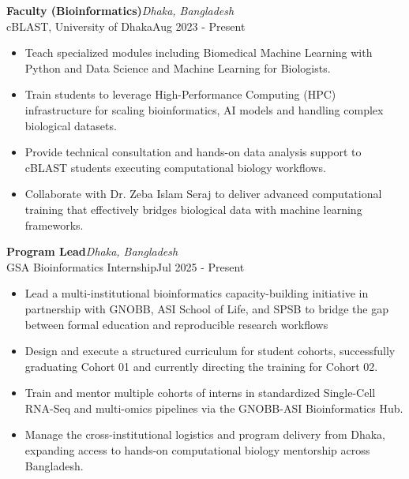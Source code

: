 \documentclass[
  11pt,
  letterpaper,
  DIV=11,
  numbers=noendperiod]{scrartcl}
\begin{document}
\noindent

\begin{minipage}{\linewidth}
\textbf{Faculty (Bioinformatics)}\hfill \textit{Dhaka, Bangladesh}\\
cBLAST, University of Dhaka\hfill Aug 2023 - Present
\end{minipage}
\begin{itemize}[nosep,topsep=2pt,leftmargin=1em]
  \item Teach specialized modules including Biomedical Machine Learning with Python and Data Science and Machine Learning for Biologists.
  \item Train students to leverage High-Performance Computing (HPC) infrastructure for scaling bioinformatics, AI models and handling complex biological datasets.
  \item Provide technical consultation and hands-on data analysis support to cBLAST students executing computational biology workflows.
  \item Collaborate with Dr. Zeba Islam Seraj to deliver advanced computational training that effectively bridges biological data with machine learning frameworks.
\end{itemize}
\vspace{5pt}

\noindent

\begin{minipage}{\linewidth}
\textbf{Program Lead}\hfill \textit{Dhaka, Bangladesh}\\
GSA Bioinformatics Internship\hfill Jul 2025 - Present
\end{minipage}
\begin{itemize}[nosep,topsep=2pt,leftmargin=1em]
  \item Lead a multi-institutional bioinformatics capacity-building initiative in partnership with GNOBB, ASI School of Life, and SPSB to bridge the gap between formal education and reproducible research workflows
  \item Design and execute a structured curriculum for student cohorts, successfully graduating Cohort 01 and currently directing the training for Cohort 02.
  \item Train and mentor multiple cohorts of interns in standardized Single-Cell RNA-Seq and multi-omics pipelines via the GNOBB-ASI Bioinformatics Hub.
  \item Manage the cross-institutional logistics and program delivery from Dhaka, expanding access to hands-on computational biology mentorship across Bangladesh.
\end{itemize}
\vspace{5pt}
\end{document}
